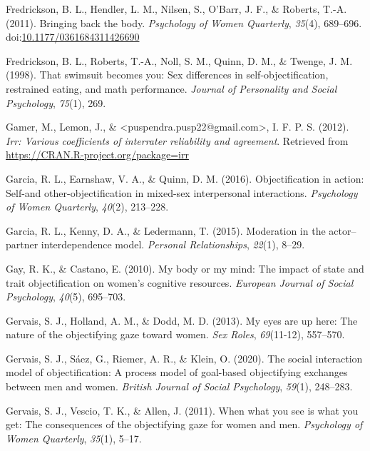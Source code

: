 \documentclass[
  man]{apa6}
\begin{document}
\leavevmode\hypertarget{ref-fredricksonetal2011}{}%
Fredrickson, B. L., Hendler, L. M., Nilsen, S., O'Barr, J. F., \& Roberts, T.-A. (2011). Bringing back the body. \emph{Psychology of Women Quarterly}, \emph{35}(4), 689--696. doi:\href{https://doi.org/10.1177/0361684311426690}{10.1177/0361684311426690}

\leavevmode\hypertarget{ref-fredrickson1998swimsuit}{}%
Fredrickson, B. L., Roberts, T.-A., Noll, S. M., Quinn, D. M., \& Twenge, J. M. (1998). That swimsuit becomes you: Sex differences in self-objectification, restrained eating, and math performance. \emph{Journal of Personality and Social Psychology}, \emph{75}(1), 269.

\leavevmode\hypertarget{ref-R-irr}{}%
Gamer, M., Lemon, J., \& \textless puspendra.pusp22@gmail.com\textgreater, I. F. P. S. (2012). \emph{Irr: Various coefficients of interrater reliability and agreement}. Retrieved from \url{https://CRAN.R-project.org/package=irr}

\leavevmode\hypertarget{ref-garcia2016objectification}{}%
Garcia, R. L., Earnshaw, V. A., \& Quinn, D. M. (2016). Objectification in action: Self-and other-objectification in mixed-sex interpersonal interactions. \emph{Psychology of Women Quarterly}, \emph{40}(2), 213--228.

\leavevmode\hypertarget{ref-garcia2015moderation}{}%
Garcia, R. L., Kenny, D. A., \& Ledermann, T. (2015). Moderation in the actor--partner interdependence model. \emph{Personal Relationships}, \emph{22}(1), 8--29.

\leavevmode\hypertarget{ref-gay2010my}{}%
Gay, R. K., \& Castano, E. (2010). My body or my mind: The impact of state and trait objectification on women's cognitive resources. \emph{European Journal of Social Psychology}, \emph{40}(5), 695--703.

\leavevmode\hypertarget{ref-gervais2013my}{}%
Gervais, S. J., Holland, A. M., \& Dodd, M. D. (2013). My eyes are up here: The nature of the objectifying gaze toward women. \emph{Sex Roles}, \emph{69}(11-12), 557--570.

\leavevmode\hypertarget{ref-gervais2020social}{}%
Gervais, S. J., Sáez, G., Riemer, A. R., \& Klein, O. (2020). The social interaction model of objectification: A process model of goal-based objectifying exchanges between men and women. \emph{British Journal of Social Psychology}, \emph{59}(1), 248--283.

\leavevmode\hypertarget{ref-gervais2011you}{}%
Gervais, S. J., Vescio, T. K., \& Allen, J. (2011). When what you see is what you get: The consequences of the objectifying gaze for women and men. \emph{Psychology of Women Quarterly}, \emph{35}(1), 5--17.
\end{document}
